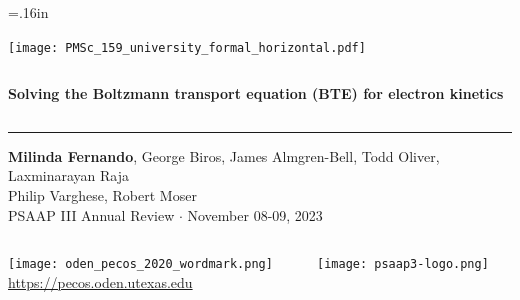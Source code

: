 \documentclass[mathserif, aspectratio=169]{beamer}
\begin{document}


\hoffset=.16in

\begin{frame}[plain,t]{}
\makeatletter
\texttt{[image: PMSc\_159\_university\_formal\_horizontal.pdf]} \newline
\begin{columns}[T,onlytextwidth]
{\bf \color{burntorange} \selectfont 
Solving the Boltzmann transport equation (BTE) for electron kinetics %
}
\end{columns}
\vspace*{.15cm}
\rule{.8\textwidth}{0.6pt} \newline

\vspace*{0.05cm}
{\selectfont
  { \scriptsize
    \textbf{Milinda Fernando}, George Biros, James Almgren-Bell, Todd Oliver, Laxminarayan Raja\\ Philip Varghese, Robert Moser \\%
  }
  {\color{burntorange} \tiny
    PSAAP III Annual Review $\cdot$ November 08-09, 2023
  }
}

\vspace*{1cm}
\begin{columns}
\begin{column}{0.8\linewidth}
\texttt{[image: oden\_pecos\_2020\_wordmark.png]}\\
{\scriptsize \url{https://pecos.oden.utexas.edu}}
\end{column}

\begin{column}{0.2\linewidth}
\texttt{[image: psaap3-logo.png]}
\end{column}
\end{columns}

\end{frame}
\hoffset=0in
\end{document}
